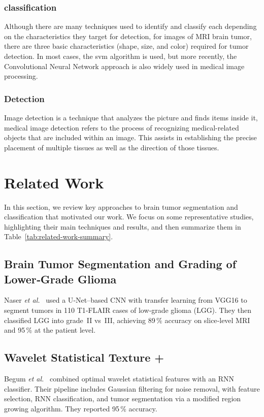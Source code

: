 \subsubsection{classification}
Although there are many techniques used to identify and classify each
depending on the characteristics they target for detection, for images of
MRI brain tumor, there are three basic characteristics (shape, size, and
color) required for tumor detection. In most cases, the svm algorithm is
used, but more recently, the Convolutional Neural Network approach is
also widely used in medical image processing.

\subsubsection{Detection}
Image detection is a technique that analyzes the picture and finds
items inside it, medical image detection refers to the process of recognizing
medical-related objects that are included within an image. This assists in
establishing the precise placement of multiple tissues as well as the direction
of those tissues.

\section{Related Work}
\label{sec:related-work}


In this section, we review key approaches to brain tumor segmentation and classification that motivated our work. We focus on some representative studies, highlighting their main techniques and results, and then summarize them in Table~\ref{tab:related-work-summary}.

\subsection{Brain Tumor Segmentation and Grading of Lower‑Grade Glioma}
Naser \emph{et al.}~\cite{naser2020glioma} used a U‑Net–based CNN with transfer learning from VGG16 to segment tumors in 110 T1‑FLAIR cases of low‑grade glioma (LGG). They then classified LGG into grade II vs III, achieving 89\,\% accuracy on slice‑level MRI and 95\,\% at the patient level.

\subsection{Wavelet Statistical Texture +  }
Begum \emph{et al.}~\cite{begum2020wavelet} combined optimal wavelet statistical features with an RNN classifier. Their pipeline includes Gaussian filtering for noise removal, with feature selection, RNN classification, and tumor segmentation via a modified region growing algorithm. They reported 95\,\% accuracy.

